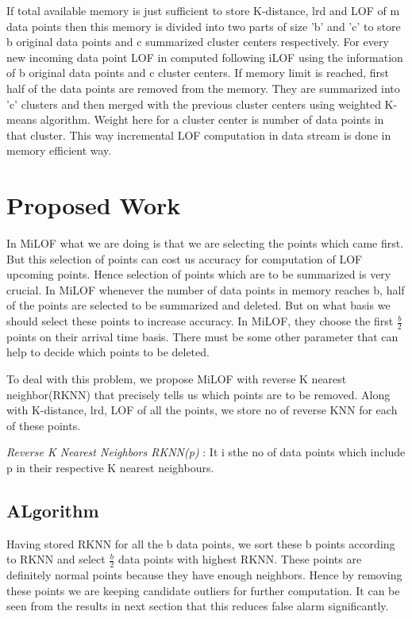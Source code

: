 \par If total available memory is just sufficient to store K-distance, lrd and LOF of m data points then this memory is divided into two parts of size 'b' and 'c' to store b original data points and c summarized cluster centers respectively. For every new incoming data point LOF in computed following iLOF using the information of b original data points and c cluster centers. If memory limit is reached, first half of the data points are removed from the memory. They are summarized into 'c' clusters and then merged with the previous cluster centers using weighted K-means algorithm. Weight here for a cluster center is number of data points in that cluster. This way incremental LOF computation in data stream is done in memory efficient way.






 \section{Proposed Work}
 In MiLOF what we are doing is that we are selecting the points which came first. But this selection of points can cost us accuracy for computation of LOF  upcoming points. Hence selection of points which are to be summarized is very crucial. In MiLOF whenever the number of data points in memory reaches b, half of the points are selected to be summarized and deleted. But on what basis we should select these points to increase accuracy. In MiLOF, they choose the first $\frac{b}{2}$ points on their arrival time basis. There must be some other parameter that can help to decide which points to be deleted.

To deal with this problem, we propose MiLOF with reverse K nearest neighbor(RKNN) that precisely tells us which points are to be removed. Along with K-distance, lrd, LOF of all the points, we store no of reverse KNN for each of these points. 

\par 

\textit{Reverse K Nearest Neighbors RKNN(p) } : It i sthe no of data points which include p in their respective K nearest neighbours.

\subsection{ALgorithm}
Having stored RKNN for all the b data points, we sort these b points according to RKNN and select $\frac{b}{2}$ data points with highest RKNN. These points are definitely normal points because they have enough neighbors. Hence by removing these points we are keeping candidate outliers for further computation. It can be seen from the results in next section that this reduces false alarm significantly.

